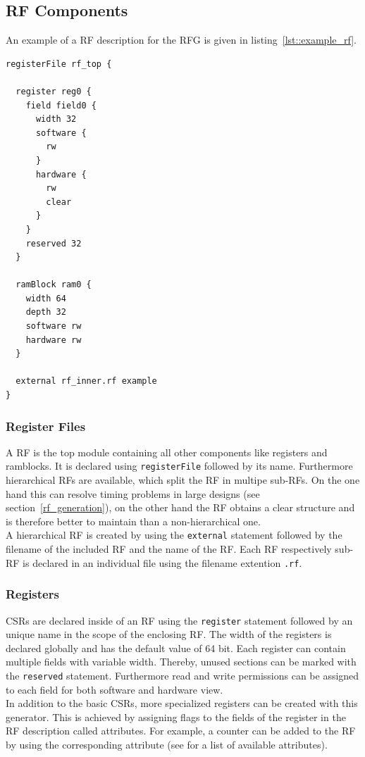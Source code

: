 \subsection{RF Components}
An example of a RF description for the RFG is given in listing~\ref{lst::example_rf}.

\begin{lstlisting}[frame=single,
caption={Example RF description},
basicstyle=\small\ttfamily,
label={lst::example_rf}]
registerFile rf_top {

  register reg0 {
    field field0 {
      width 32
      software {
        rw
      }
      hardware {
        rw
        clear
      }
    }
    reserved 32
  }
	
  ramBlock ram0 {
    width 64
    depth 32
    software rw
    hardware rw
  }
	
  external rf_inner.rf example
}
\end{lstlisting}

\subsubsection{Register Files}
A RF is the top module containing all other components like registers and ramblocks. It is declared using \lstinline$registerFile$ followed by its name.
Furthermore hierarchical RFs are available, which split the RF in multipe sub-RFs. On the one hand this can resolve timing problems in large designs (see section~\ref{rf_generation}), on the other hand the RF obtains a clear structure and is therefore better to maintain than a non-hierarchical one.\\
A hierarchical RF is created by using the \lstinline$external$ statement followed by the filename of the included RF and the name of the RF. Each RF respectively sub-RF is declared in an individual file using the filename extention \lstinline$.rf$.
\subsubsection{Registers}
CSRs are declared inside of an RF using the \lstinline$register$ statement followed by an unique name in the scope of the enclosing RF. The width of the registers is declared globally and has the default value of 64 bit. Each register can contain multiple fields with variable width. Thereby, unused sections can be marked with the \lstinline$reserved$ statement. Furthermore read and write permissions can be assigned to each field for both software and hardware view.\\
In addition to the basic CSRs, more specialized registers can be created with this generator. This is achieved by assigning flags to the fields of the register in the RF description called attributes. For example, a counter can be added to the RF by using the corresponding attribute (see \cite{rfg_spec} for a list of available attributes).
